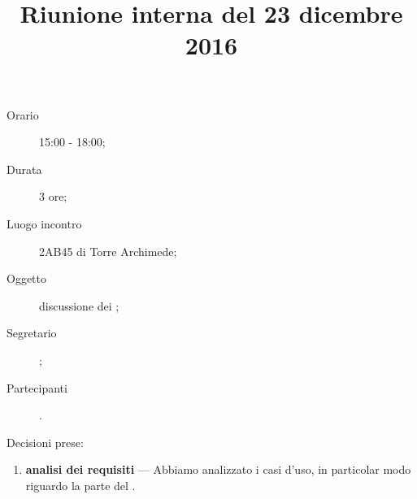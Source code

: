


\author{\PB}
\supervisor{\MM}
\dest{\ALL}
\title{Riunione interna del 23 dicembre 2016}



\maketitle

\begin{description}
	\item[Orario] 15:00 - 18:00;
	\item[Durata] 3 ore;
	\item[Luogo incontro] 2AB45 di Torre Archimede; 
	\item[Oggetto] discussione dei ;
	\item[Segretario] \PB; 
	\item[Partecipanti] \ALL.
\end{description}

Decisioni prese:
\begin{enumerate}
	\item \textbf{analisi dei requisiti} --- Abbiamo analizzato i casi d'uso, in particolar modo riguardo la parte del .
\end{enumerate}


